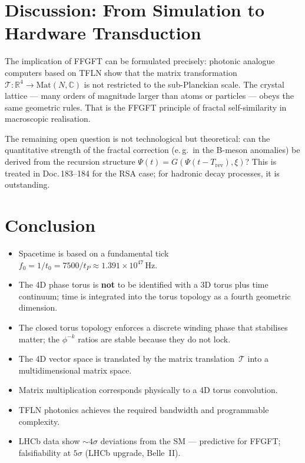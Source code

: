 \section{Discussion: From Simulation to Hardware Transduction}

The implication of FFGFT can be formulated precisely: photonic analogue
computers based on TFLN show that the matrix transformation
$\mathcal{T}: \mathbb{R}^4 \to \mathrm{Mat}(N,\mathbb{C})$
is not restricted to the sub-Planckian scale. The crystal lattice
— many orders of magnitude larger than atoms or particles — obeys
the same geometric rules. That is the FFGFT principle of fractal
self-similarity in macroscopic realisation.

The remaining open question is not technological but theoretical:
can the quantitative strength of the fractal correction
(e.\,g.\ in the B-meson anomalies) be derived from the recursion
structure $\Psi(t) = G(\Psi(t-T_{\text{rev}}), \xi)$?
This is treated in Doc.\,183--184 for the RSA case;
for hadronic decay processes, it is outstanding.

\section{Conclusion}

\begin{itemize}
  \item Spacetime is based on a fundamental tick
        $f_0 = 1/t_0 = 7500/t_P \approx 1.391 \times 10^{47}\,\text{Hz}$.
  \item The 4D phase torus is \textbf{not} to be identified with a 3D
        torus plus time continuum; time is integrated into the torus
        topology as a fourth geometric dimension.
  \item The closed torus topology enforces a discrete winding phase that
        stabilises matter; the $\phi^{-k}$ ratios are stable because they
        do not lock.
  \item The 4D vector space is translated by the matrix
        translation~$\mathcal{T}$ into a multidimensional matrix space.
  \item Matrix multiplication corresponds physically to a 4D torus
        convolution.
  \item TFLN photonics achieves the required bandwidth and programmable
        complexity.
  \item LHCb data show $\sim 4\sigma$ deviations from the SM —
        predictive for FFGFT; falsifiability at $5\sigma$ (LHCb upgrade, Belle~II).
\end{itemize}

